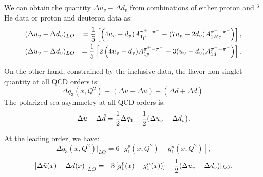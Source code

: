 We can obtain the \lo quantity 
$\Delta u_v - \Delta d_v$ from combinations of either proton and $^3$He data or proton and deuteron data as:
\begin{eqnarray}
\label{Eq:uvdv}
&(\Delta u_v - \Delta d_v)_{LO}&  = {1 \over 5} \left[  \left( 4u_v - d_v)  
A_{1p}^{\pi^+ - \pi^-} 
                 -  (7u_v + 2 d_v) A_{1He}^{\pi^+ - \pi^-} \right) \right], \\ 
&(\Delta u_v - \Delta d_v)_{LO}&  = {1 \over 5} \left[ 2 \left( 4u_v - d_v)  
A_{1p}^{\pi^+ - \pi^-} 
                 -3  (u_v + d_v) A_{1d}^{\pi^+ - \pi^-} \right) \right]. 
\end{eqnarray}

On the other hand, constrained by the inclusive data, the flavor non-singlet quantity at all QCD orders is:
\begin{equation}
\label{Eq:cl3}
\Delta q_3(x,Q^2) \equiv (\Delta u + \Delta \bar{u}) - (\Delta d + \Delta \bar{d}).
\end{equation}
The polarized sea asymmetry at all QCD orders is:
\begin{equation}
 \Delta \bar{u} - \Delta \bar{d} = {1 \over 2}\Delta q_3 - {1 \over 2}(\Delta u_v - \Delta d_v).
\end{equation}


At the leading order, we have:
\begin{equation}
\Delta q_3(x,Q^2) \vert_{LO} = 6 \left[ g_1^p(x,Q^2) - g_1^n(x,Q^2) \right],
\end{equation}
\begin{eqnarray}
\label{Eq:cl4}
\left[\Delta \bar{u}(x) - \Delta \bar{d}(x) \right]_{LO} & = & 3 \left[ g_1^p(x)- g_1^n(x)) \right] 
 - {1 \over 2} (\Delta u_v - \Delta d_v) \vert_{LO}.
\end{eqnarray}

